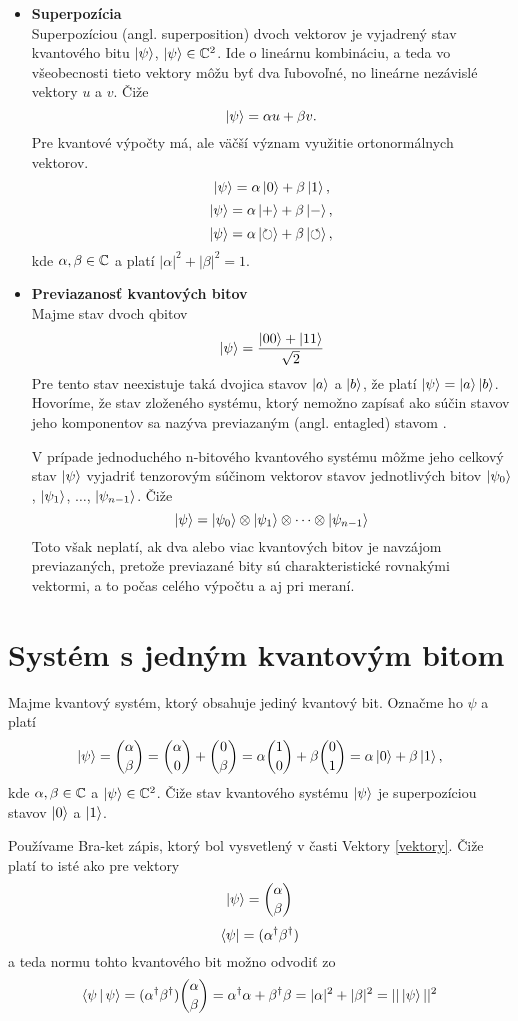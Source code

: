 \begin{itemize}
\item[] \textbf{Superpozícia} \\
Superpozíciou (angl. superposition) dvoch vektorov je vyjadrený stav kvantového bitu \(\Ket{\psi}\), \(\Ket{\psi} \in \mathbb{C}^2\).
Ide o lineárnu kombináciu, a teda vo všeobecnosti tieto vektory môžu byť dva ľubovoľné, no lineárne nezávislé vektory \(u\) a \(v\). Čiže
\[\Ket{\psi} = \alpha u + \beta v.\]
Pre kvantové výpočty má, ale väčší význam využitie ortonormálnych vektorov.
\[\Ket{\psi} = \alpha \Ket{0} + \beta \Ket{1},\]
\[\Ket{\psi} = \alpha \Ket{+} + \beta \Ket{-},\]
\[\Ket{\psi} = \alpha \Ket{\circlearrowright} + \beta \Ket{\circlearrowleft},\]
kde \(\alpha, \beta \in \mathbb{C}\) a platí \(|\alpha|^2 + |\beta|^2 = 1\).

\item[] \textbf{Previazanosť kvantových bitov} \\
Majme stav dvoch qbitov
\[\Ket{\psi} = \frac{\Ket{00} + \Ket{11}}{\sqrt{2}}\]
Pre tento stav neexistuje taká dvojica stavov \(\Ket{a}\) a \(\Ket{b}\), že platí \(\Ket{\psi} = \Ket{a}\Ket{b}\).
Hovoríme, že stav zloženého systému, ktorý nemožno zapísať ako súčin stavov jeho komponentov sa nazýva previazaným (angl. entagled) stavom \cite{Nie+00}.

V prípade jednoduchého n-bitového kvantového systému môžme jeho celkový stav \(\Ket{\psi}\) vyjadriť tenzorovým súčinom vektorov stavov jednotlivých bitov \(\Ket{\psi_0}\), \(\Ket{\psi_1}\), \(\dots\), \(\Ket{\psi_{n-1}}\).
Čiže
\[\Ket{\psi} = \Ket{\psi_0} \otimes \Ket{\psi_1} \otimes \dots \otimes \Ket{\psi_{n-1}}\]
Toto však neplatí, ak dva alebo viac kvantových bitov je navzájom previazaných,
pretože previazané bity sú charakteristické rovnakými vektormi, a to počas celého výpočtu a aj pri meraní.
\end{itemize}

\section{Systém s jedným kvantovým bitom}
Majme kvantový systém, ktorý obsahuje jediný kvantový bit. Označme ho \(\psi\)
a platí
\[\Ket{\psi} = \binom{\alpha}{\beta} = \binom{\alpha}{0} + \binom{0}{\beta} = \alpha \binom{1}{0} + \beta \binom{0}{1} = \alpha \Ket{0} + \beta \Ket{1}, \]
kde \(\alpha, \beta \in \mathbb{C}\) a \(\Ket{\psi} \in \mathbb{C}^{2}\).
Čiže stav kvantového systému \(\Ket{\psi}\) je superpozíciou stavov \(\Ket{0}\) a \(\Ket{1}\).

Používame Bra-ket zápis, ktorý bol vysvetlený v časti Vektory \ref{vektory}. 
Čiže platí to isté ako pre vektory
\[\Ket{\psi} = \binom{\alpha}{\beta}\]
\[\Bra{\psi} = (\alpha^{\dag}\beta^{\dag})\]
a teda normu tohto kvantového bit možno odvodiť zo
\[\Braket{\psi|\psi} = (\alpha^{\dag}\beta^{\dag})\binom{\alpha}{\beta} = \alpha^{\dag}\alpha + \beta^{\dag}\beta = |\alpha|^{2} + |\beta|^{2} = ||\Ket{\psi}||^{2}\]

